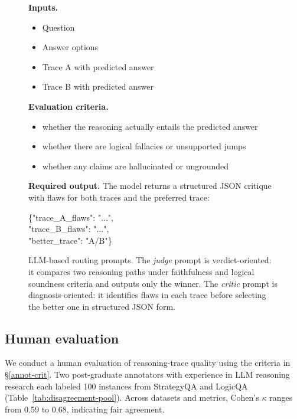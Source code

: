 \documentclass[10pt]{article}
\begin{document}
\begin{figure}[t]
\begin{minipage}[t]{0.485\textwidth}
\begin{tcolorbox}[promptcard,title=LLM-as-Critic]
\vspace{2pt}
\textbf{Inputs.}
\begin{itemize}
    \setlength{\itemsep}{1pt}
    \item Question
    \item Answer options
    \item Trace A with predicted answer
    \item Trace B with predicted answer
\end{itemize}

\vspace{-2pt}
\textbf{Evaluation criteria.}
\begin{itemize}
    \setlength{\itemsep}{1pt}
    \item whether the reasoning actually entails the predicted answer
    \item whether there are logical fallacies or unsupported jumps
    \item whether any claims are hallucinated or ungrounded
\end{itemize}

\vspace{-2pt}
\textbf{Required output.}
The model returns a structured JSON critique with flaws for both traces and the preferred trace:
\begin{center}
\ttfamily
\{"trace\_A\_flaws": "...",\\
"trace\_B\_flaws": "...",\\
"better\_trace": "A/B"\}
\end{center}
\end{tcolorbox}
\end{minipage}

\vspace{2pt}
\caption{LLM-based routing prompts. The \emph{judge} prompt is verdict-oriented: it compares two reasoning paths under faithfulness and logical soundness criteria and outputs only the winner. The \emph{critic} prompt is diagnosis-oriented: it identifies flaws in each trace before selecting the better one in structured JSON form.}
\label{fig:judge_critic_prompts}
\end{figure}




\subsection{Human evaluation}\label{app:human_eval}
We conduct a human evaluation of reasoning-trace quality using the criteria in \S\ref{annot-crit}. Two post-graduate annotators with experience in LLM reasoning research each labeled 100 instances from StrategyQA and LogicQA (Table~\ref{tab:disagreement-pool}). Across datasets and metrics, Cohen's \(\kappa\) ranges from 0.59 to 0.68, indicating fair agreement.
\end{document}
